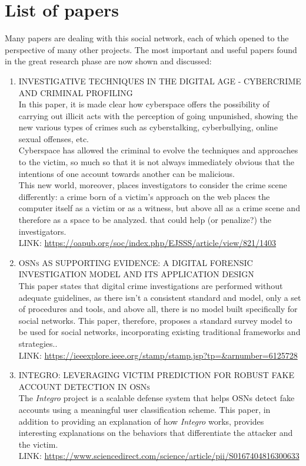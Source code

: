 \section{List of papers}
Many papers are dealing with this social network, each of which opened to the perspective of many other projects. The most important and useful papers found in the great research phase are now shown and discussed:
\begin{enumerate}
	\item 
	\textsc{INVESTIGATIVE TECHNIQUES IN THE DIGITAL AGE - CYBERCRIME AND CRIMINAL PROFILING}
	\\ In this paper, it is made clear how cyberspace offers the possibility of carrying out illicit acts with the perception of going unpunished, showing the new various types of crimes such as cyberstalking, cyberbullying, online sexual offenses, etc.
	\\Cyberspace has allowed the criminal to evolve the techniques and approaches to the victim, so much so that it is not always immediately obvious that the intentions of one account towards another can be malicious.
	\\This new world, moreover, places investigators to consider the crime scene differently: a crime born of a victim's approach on the web places the computer itself as a victim or as a witness, but above all as a crime scene and therefore as a space to be analyzed. that could help (or penalize?) the investigators. \\
	LINK: \href{https://oapub.org/soc/index.php/EJSSS/article/view/821/1403}{https://oapub.org/soc/index.php/EJSSS/article/view/821/1403}
	
	\item 
	\textsc{OSNs AS SUPPORTING EVIDENCE: A DIGITAL FORENSIC INVESTIGATION MODEL AND ITS APPLICATION DESIGN}
	\\ This paper states that digital crime investigations are performed without adequate guidelines, as there isn't a consistent standard and model, only a set of procedures and tools, and above all, there is no model built specifically for social networks. This paper, therefore, proposes a standard survey model to be used for social networks, incorporating existing traditional frameworks and strategies.. 
	\\ LINK: \href{https://ieeexplore.ieee.org/stamp/stamp.jsp?tp=\&arnumber=6125728}{https://ieeexplore.ieee.org/stamp/stamp.jsp?tp=\&arnumber=6125728}
	
	\item
	\textsc{INTEGRO: LEVERAGING VICTIM PREDICTION FOR ROBUST FAKE ACCOUNT DETECTION IN OSNs}
	\\ The \textit{Integro} project is a scalable defense system that helps OSNs detect fake accounts using a meaningful user classification scheme. This paper, in addition to providing an explanation of how \textit{Integro} works, provides interesting explanations on the behaviors that differentiate the attacker and the victim.
	\\ LINK: \href{https://www.sciencedirect.com/science/article/pii/S0167404816300633}{https://www.sciencedirect.com/science/article/pii/S0167404816300633}
	

\end{enumerate}
